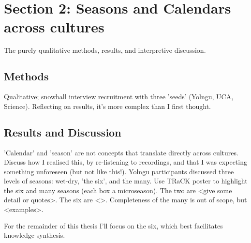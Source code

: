 \chapter{Section 2:  Seasons and Calendars across cultures}
The purely qualitative methods, results, and interpretive discussion.

\section{Methods}
Qualitative; snowball interview recruitment with three 'seeds' (Yolngu, UCA, Science).
Reflecting on results, it's more complex than I first thought.

\section{Results and Discussion}
'Calendar' and 'season' are not concepts that translate directly across cultures. 
Discuss how I realised this, by re-listening to recordings, and that I was expecting something unforeseen (but not like this!).  
Yolngu participants discussed three levels of seasons:  wet-dry, 'the six', and the many.
Use TRaCK poster to highlight the six and many seasons (each box a microseason).
The two are <give some detail or quotes>.
The six are <>.
Completeness of the many is out of scope, but <examples>.  

For the remainder of this thesis I'll focus on the six, which best facilitates knowledge synthesis.

